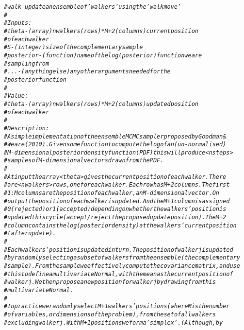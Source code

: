 \documentclass{article}\usepackage[]{graphicx}\usepackage[]{color}
\makeatletter
\newcommand{\hlcom}[1]{\textcolor[rgb]{0.678,0.584,0.686}{\textit{#1}}}%
\newenvironment{kframe}{%
 \def\at@end@of@kframe{}%
 \ifinner\ifhmode%
  \def\at@end@of@kframe{\end{minipage}}%
  \begin{minipage}{\columnwidth}%
 \fi\fi%
 \def\FrameCommand##1{\hskip\@totalleftmargin \hskip-\fboxsep
 \colorbox{shadecolor}{##1}\hskip-\fboxsep
     \hskip-\linewidth \hskip-\@totalleftmargin \hskip\columnwidth}%
 \MakeFramed {\advance\hsize-\width
   \@totalleftmargin\z@ \linewidth\hsize
   \@setminipage}}%
 {\par\unskip\endMakeFramed%
 \at@end@of@kframe}
\newenvironment{knitrout}{}{} %
\makeatother
\begin{document}
\begin{knitrout}
\color{fgcolor}\begin{kframe}
\begin{alltt}
\hlcom{# walk - update an ensemble of 'walkers' using the 'walk move'}
\hlcom{#}
\hlcom{# Inputs: }
\hlcom{#   theta      - (array) nwalkers (rows) * M+2 (columns) current position }
\hlcom{#                   of each walker}
\hlcom{#   S          - (integer) size of the complementary sample }
\hlcom{#   posterior  - (function) name of the log(posterior) function we are }
\hlcom{#                   sampling from}
\hlcom{#   ...        - (anything else) any other arguments needed for the }
\hlcom{#                   posterior function}
\hlcom{#}
\hlcom{# Value:}
\hlcom{#   theta     - (array) nwalkers (rows) * M+2 (columns) updated position }
\hlcom{#                 of each walker}
\hlcom{#}
\hlcom{# Description:}
\hlcom{# A simple implementation of the ensemble MCMC sampler proposed by Goodman &}
\hlcom{# Weare (2010). Given some function to compute the log of an (un-normalised)}
\hlcom{# M-dimensional posterior density function (PDF) this will produce <nsteps>}
\hlcom{# samples of M-dimensional vectors drawn from the PDF.}
\hlcom{# }
\hlcom{# At input the array <theta> gives the current position of each walker. There}
\hlcom{# are <nwalkers> rows, one for each walker. Each row has M+2 columns. The first}
\hlcom{# 1:M columns are the position of each walker, an M-dimensional vector. On}
\hlcom{# output the position of each walker is updated. And the M+1 column is assigned}
\hlcom{# 0 (rejected) or 1 (accepted) depending on whether the walkers' position is}
\hlcom{# updated this cycle (accept/reject the proposed update position). The M+2}
\hlcom{# column contains the log(posterior density) at the walkers' current position}
\hlcom{# (after update).}
\hlcom{# }
\hlcom{# Each walkers' position is updated in turn. The position of walker j is updated}
\hlcom{# by randomly selecting a subset of walkers from the ensemble (the complementary}
\hlcom{# sample). From the sample we effectively compute the covariance matrix, and use}
\hlcom{# this to define a multivariate Normal, with the mean as the current position of}
\hlcom{# walker j. We then propose a new position for walker j by drawing from this }
\hlcom{# multivariate Normal.}
\hlcom{# }
\hlcom{# In practice we randomly select M+1 walkers' positions (where M is the number}
\hlcom{# of variables, or dimensions of the problem), from the set of all walkers}
\hlcom{# excluding walker j. With M+1 positions we form a 'simplex'. (Although, by}

\end{alltt}
\end{kframe}
\end{knitrout}
\end{document}
